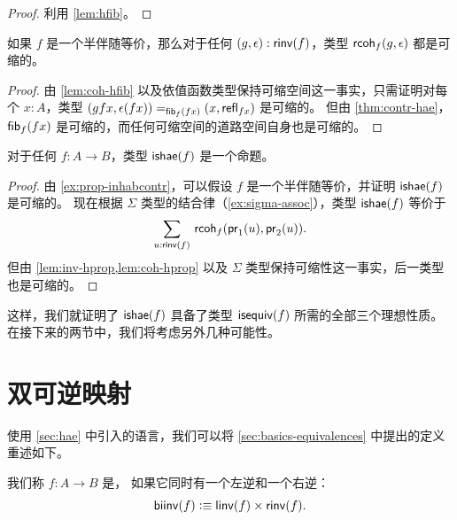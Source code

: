 \begin{proof}
利用 \cref{lem:hfib}。
\end{proof}

\begin{lem}\label{lem:coh-hprop}
  如果 $f$ 是一个半伴随等价，那么对于任何 $(g,\epsilon) : \rinv(f)$，类型 $\rcoh{f}{g}{\epsilon}$ 都是可缩的。
\end{lem}

\begin{proof}
  由 \cref{lem:coh-hfib} 以及依值函数类型保持可缩空间这一事实，只需证明对每个 $x:A$，类型 $\id[\hfib{f}{fx}]{(gfx,\epsilon(fx))}{(x,\refl{fx})}$ 是可缩的。
  但由 \cref{thm:contr-hae}，$\hfib{f}{fx}$ 是可缩的，而任何可缩空间的道路空间自身也是可缩的。
\end{proof}

\begin{thm}\label{thm:hae-hprop}
  对于任何 $f : A \to B$，类型 $\ishae(f)$ 是一个命题。
\end{thm}

\begin{proof}
  由 \cref{ex:prop-inhabcontr}，可以假设 $f$ 是一个半伴随等价，并证明 $\ishae(f)$ 是可缩的。
  现在根据 $\Sigma$ 类型的结合律（\cref{ex:sigma-assoc}），类型 $\ishae(f)$ 等价于
  \[\sm{u : \rinv(f)} \rcoh{f}{\proj{1}(u)}{\proj{2}(u)}.\]
  但由 \cref{lem:inv-hprop,lem:coh-hprop} 以及 $\Sigma$ 类型保持可缩性这一事实，后一类型也是可缩的。
\end{proof}

这样，我们就证明了 $\ishae(f)$ 具备了类型 $\isequiv(f)$ 所需的全部三个理想性质。
在接下来的两节中，我们将考虑另外几种可能性。

%
%
%

\section{双可逆映射}
\label{sec:biinv}

%
%
%

使用 \cref{sec:hae} 中引入的语言，我们可以将 \cref{sec:basics-equivalences} 中提出的定义重述如下。

\begin{defn}\label{defn:biinv}
  我们称 $f:A\to B$ 是，
  如果它同时有一个左逆和一个右逆：
  \[ \biinv (f) \defeq \linv(f) \times \rinv(f). \]
\end{defn}

